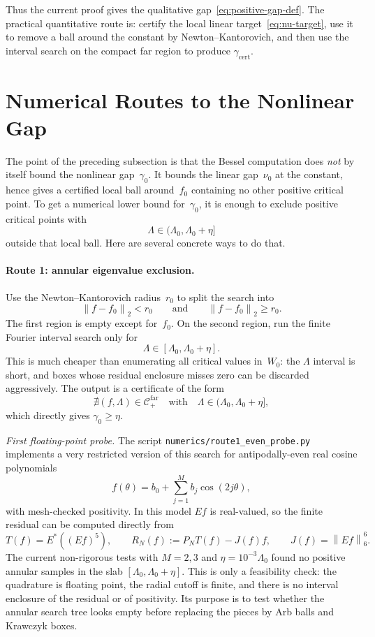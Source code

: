 \documentclass[12pt]{article}
\theoremstyle{definition}
\theoremstyle{remark}
\newcommand{\norm}[1]{\left\|#1\right\|}
\begin{document}
Thus the current proof gives the qualitative gap~\eqref{eq:positive-gap-def}.
The practical quantitative route is: certify the local linear
target~\eqref{eq:nu-target}, use it to remove a ball around the constant
by Newton--Kantorovich, and then use the interval search on the compact
far region to produce $\gamma_{\mathrm{cert}}$.



\section{Numerical Routes to the Nonlinear Gap}
\label{sec:revisit-numerical-gap}


\label{sec:gamma0-routes}

The point of the preceding subsection is that the Bessel computation does
\emph{not} by itself bound the nonlinear gap~$\gamma_0$.  It bounds the
linear gap~$\nu_0$ at the constant, hence gives a certified local ball
around~$f_0$ containing no other positive critical point.  To get a
numerical lower bound for~$\gamma_0$, it is enough to exclude positive
critical points with
\[
  \Lambda\in(\Lambda_0,\Lambda_0+\eta]
\]
outside that local ball.  Here are several concrete ways to do that.

\paragraph{Route 1: annular eigenvalue exclusion.}
Use the Newton--Kantorovich radius~$r_0$ to split the search into
\[
  \norm{f-f_0}_2<r_0
  \qquad\text{and}\qquad
  \norm{f-f_0}_2\geq r_0 .
\]
The first region is empty except for~$f_0$.  On the second region, run
the finite Fourier interval search only for
\[
  \Lambda\in[\Lambda_0,\Lambda_0+\eta].
\]
This is much cheaper than enumerating all critical values in~$W_0$:
the $\Lambda$ interval is short, and boxes whose residual enclosure
misses zero can be discarded aggressively.  The output is a certificate
of the form
\[
  \nexists (f,\Lambda)\in\mathcal C_+^{\mathrm{far}}
  \quad\text{with}\quad
  \Lambda\in(\Lambda_0,\Lambda_0+\eta],
\]
which directly gives $\gamma_0\geq\eta$.

\emph{First floating-point probe.}
The script \texttt{numerics/route1\_even\_probe.py} implements a very
restricted version of this search for antipodally-even real cosine
polynomials
\[
  f(\theta)=b_0+\sum_{j=1}^M b_j\cos(2j\theta),
\]
with mesh-checked positivity.  In this model \(Ef\) is real-valued, so the
finite residual can be computed directly from
\[
  T(f)=E^*((Ef)^5),\qquad
  R_N(f):=P_NT(f)-J(f)f,\qquad J(f)=\norm{Ef}_6^6.
\]
The current non-rigorous tests with \(M=2,3\) and
\(\eta=10^{-3}\Lambda_0\) found no positive annular samples in the slab
\([\Lambda_0,\Lambda_0+\eta]\).  This is only a feasibility check: the
quadrature is floating point, the radial cutoff is finite, and there is no
interval enclosure of the residual or of positivity.  Its purpose is to
test whether the annular search tree looks empty before replacing the
pieces by Arb balls and Krawczyk boxes.
\end{document}
